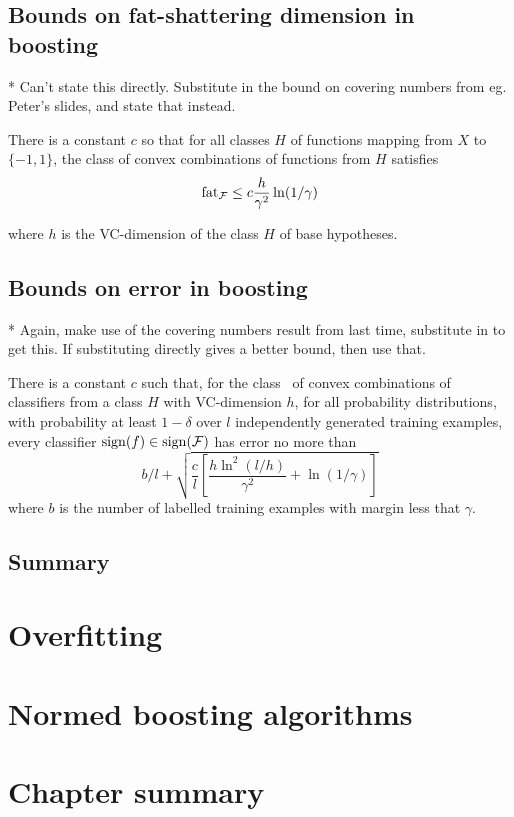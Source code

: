 \subsection{Bounds on fat-shattering dimension in boosting}

* Can't state this directly.  Substitute in the bound on covering
  numbers from eg. Peter's slides, and state that instead.

There is a constant $c$ so that for all classes $H$ of functions
mapping from $X$ to $\{-1, 1\}$, the class of convex combinations of
functions from $H$ satisfies
\begin{equation}
\mathrm{fat}_{\mathcal{F}} \leq c \frac{h}{\gamma^2} \ln (1/\gamma)
\end{equation}

where $h$ is the VC-dimension of the class $H$ of base hypotheses.

\subsection{Bounds on error in boosting}

* Again, make use of the covering numbers result from last time,
  substitute in to get this.  If substituting directly gives a better
  bound, then use that.

There is a constant $c$ such that, for the class \calF\ of convex
combinations of classifiers from a class $H$ with VC-dimension $h$,
for all probability distributions, with probability at least
$1-\delta$ over $l$ independently generated training examples, every
classifier $\mathrm{sign}(f) \in \mathrm{sign}(\mathcal{F})$ has error no more than
\begin{equation}
b/l + \sqrt{\frac{c}{l} \left[ \frac{h \ln^2 (l/h)}{\gamma^2} +
\ln(1/\gamma) \right] }
\end{equation}
where $b$ is the number of labelled training examples with margin less
that $\gamma$.

\subsection{Summary}

\section{Overfitting}


\section{Normed boosting algorithms}


\section{Chapter summary}



